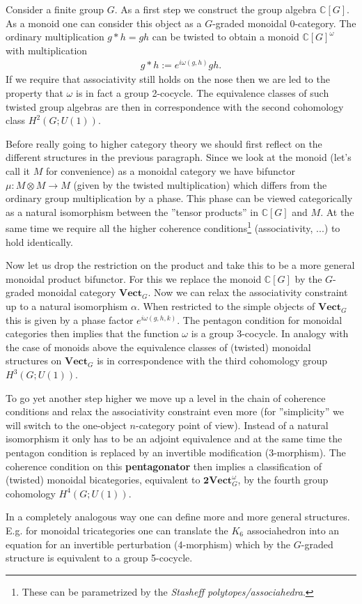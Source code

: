     Consider a finite group $G$. As a first step we construct the group algebra $\mathbb{C}[G]$. As a monoid one can consider this object as a $G$-graded monoidal 0-category. The ordinary multiplication $g\ast h=gh$ can be twisted to obtain a monoid $\mathbb{C}[G]^\omega$ with multiplication
    \begin{gather}
        g\ast h := e^{i\omega(g, h)}gh.
    \end{gather}
    If we require that associativity still holds on the nose then we are led to the property that $\omega$ is in fact a group 2-cocycle. The equivalence classes of such twisted group algebras are then in correspondence with the second cohomology class $H^2(G; U(1))$.

    Before really going to higher category theory we should first reflect on the different structures in the previous paragraph. Since we look at the monoid (let's call it $M$ for convenience) as a monoidal category we have bifunctor $\mu:M\otimes M\rightarrow M$ (given by the twisted multiplication) which differs from the ordinary group multiplication by a phase. This phase can be viewed categorically as a natural isomorphism between the ''tensor products'' in $\mathbb{C}[G]$ and $M$. At the same time we require all the higher coherence conditions\footnote{These can be parametrized by the \textit{Stasheff polytopes/associahedra}.} (associativity, ...) to hold identically.

    Now let us drop the restriction on the product and take this to be a more general monoidal product bifunctor. For this we replace the monoid $\mathbb{C}[G]$ by the $G$-graded monoidal category $\mathbf{Vect}_G$. Now we can relax the associativity constraint up to a natural isomorphism $\alpha$. When restricted to the simple objects of $\mathbf{Vect}_G$ this is given by a phase factor $e^{i\omega(g, h, k)}$. The pentagon condition for monoidal categories then implies that the function $\omega$ is a group 3-cocycle. In analogy with the case of monoids above the equivalence classes of (twisted) monoidal structures on $\mathbf{Vect}_G$ is in correspondence with the third cohomology group $H^3(G; U(1))$.

    To go yet another step higher we move up a level in the chain of coherence conditions and relax the associativity constraint even more (for ''simplicity'' we will switch to the one-object $n$-category point of view). Instead of a natural isomorphism it only has to be an adjoint equivalence and at the same time the pentagon condition is replaced by an invertible modification (3-morphism). The coherence condition on this \textbf{pentagonator} then implies a classification of (twisted) monoidal bicategories, equivalent to $\mathbf{2Vect}_G^\omega$, by the fourth group cohomology $H^4(G; U(1))$.

    In a completely analogous way one can define more and more general structures. E.g. for monoidal tricategories one can translate the $K_6$ associahedron into an equation for an invertible perturbation (4-morphism) which by the $G$-graded structure is equivalent to a group 5-cocycle.

